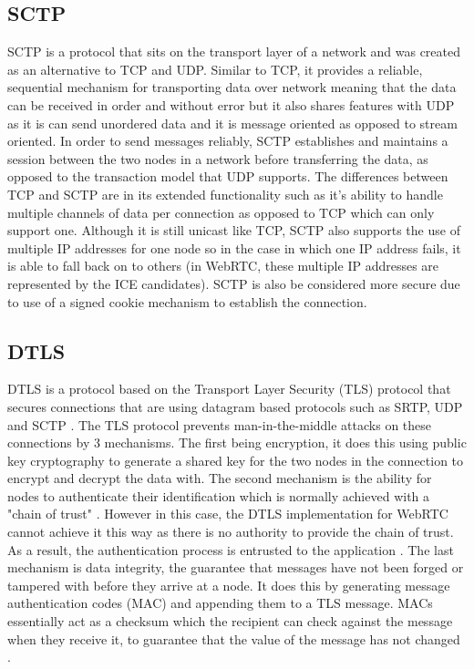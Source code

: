 \documentclass[]{report}
\begin{document}
	  \subsection{SCTP}
	  SCTP is a protocol that sits on the transport layer of a network and was created as an alternative to TCP and UDP. Similar to TCP, it provides a reliable, sequential mechanism for transporting data over network meaning that the data can be received in order and without error \cite{SCTP} but it also shares features with UDP as it is can send unordered data and it is message oriented as opposed to stream oriented. In order to send messages reliably, SCTP establishes and maintains a session between the two nodes in a network before transferring the data, as opposed to the transaction model that UDP supports. The differences between TCP and SCTP are in its extended functionality such as it's ability to handle multiple channels of data per connection as opposed to TCP which can only support one. Although it is still unicast like TCP, SCTP also supports the use of multiple IP addresses for one node so in the case in which one IP address fails, it is able to fall back on to others (in WebRTC, these multiple IP addresses are represented by the ICE candidates). SCTP is also be considered more secure due to use of a signed cookie mechanism to establish the connection. \cite{SCTP ISOC}
	  
	  \subsection{DTLS}
	  DTLS is a protocol based on the Transport Layer Security (TLS) protocol that secures connections that are using datagram based protocols such as SRTP, UDP and SCTP \cite{DTLS}. The TLS protocol prevents man-in-the-middle attacks on these connections by 3 mechanisms. The first being encryption, it does this using public key cryptography to generate a shared key for the two nodes in the connection to encrypt and decrypt the data with. The second mechanism is the ability for nodes to authenticate their identification which is normally achieved with a "chain of trust" \cite{TLS}. However in this case, the DTLS implementation for WebRTC cannot achieve it this way as there is no authority to provide the chain of trust. As a result, the authentication process is entrusted to the application \cite{WebRTC DTLS}. The last mechanism is data integrity, the guarantee that messages have not been forged or tampered with before they arrive at a node. It does this by generating message authentication codes (MAC) and appending them to a TLS message. MACs essentially act as a checksum which the recipient can check against the message when they receive it, to guarantee that the value of the message has not changed \cite{TLS}.
				
\end{document}
